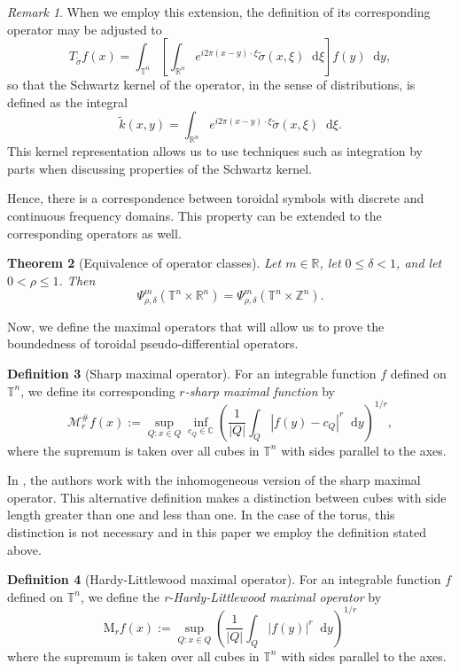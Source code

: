 \documentclass[12pt, reqno]{amsart}
\newtheorem{theorem}{Theorem}[section]
\theoremstyle{definition}
\newtheorem{definition}[theorem]{Definition}
\theoremstyle{remark}
\newtheorem{remark}[theorem]{Remark}
\numberwithin{equation}{section}
\newcommand*\diff{\mathop{}\!\mathrm{d}}
\begin{document}
\begin{remark}
    When we employ this extension, the definition of its corresponding operator may be adjusted to 
    \begin{equation*}
        T_{\tilde{\sigma}}f(x) = \int_{\mathbb{T}^n} \left[ \int_{\mathbb{R}^n} e^{i2\pi (x-y) \cdot \xi} \tilde{\sigma}(x, \xi)\diff \xi \right] f(y) \diff y ,
    \end{equation*}
    so that the Schwartz kernel of the operator, in the sense of distributions, is defined as the integral 
    \begin{equation*}
        \tilde{k}(x, y) = \int_{\mathbb{R}^n} e^{i2\pi (x-y) \cdot \xi} \tilde{\sigma}(x, \xi)\diff \xi.
    \end{equation*}
    This kernel representation allows us to use techniques such as integration by parts when discussing properties of the Schwartz kernel.
\end{remark}
Hence, there is a correspondence between toroidal symbols with discrete and continuous frequency domains. This property can be extended to the corresponding operators as well.
\begin{theorem}[Equivalence of operator classes]
    Let $m \in \mathbb{R}$, let $0\leq\delta<1$, and let $0< \rho \leq 1$. Then 
        \begin{equation*}
            \Psi^m_{\rho,\delta}(\mathbb{T}^n\times \mathbb{R}^n) = \Psi^m_{\rho,\delta}(\mathbb{T}^n\times \mathbb{Z}^n).
        \end{equation*}
\end{theorem}
Now, we define the maximal operators that will allow us to prove the boundedness of toroidal pseudo-differential operators.
\begin{definition}[Sharp maximal operator]
    For an integrable function $f$ defined on $\mathbb{T}^n$, we define its corresponding \textit{$r$-sharp maximal function} by 
    \begin{equation*}
        \mathcal{M}^\#_rf(x) := \sup_{Q:x\in Q} \inf_{c_Q \in \mathbb{C}}\left(
        \frac{1}{|Q|} \int_Q |f(y) - c_Q|^r\diff y
        \right)^{1/r},
    \end{equation*}
    where the supremum is taken over all cubes in $\mathbb{T}^n$ with sides parallel to the axes.
\end{definition}
In \cite{park-tomita}, the authors work with the inhomogeneous version of the sharp maximal operator. This alternative definition makes a distinction between cubes with side length greater than one and less than one. In the case of the torus, this distinction is not necessary and in this paper we employ the definition stated above.
\begin{definition}[Hardy-Littlewood maximal operator]
    For an integrable function $f$ defined on $\mathbb{T}^n$, we define the \textit{r-Hardy-Littlewood maximal operator} by 
    \begin{equation*}
        \mathrm{M}_rf(x) := \sup_{Q:x\in Q} \left( 
        \frac{1}{|Q|} \int_Q |f(y)|^r \diff y
        \right)^{1/r}
    \end{equation*}
    where the supremum is taken over all cubes in $\mathbb{T}^n$ with sides parallel to the axes.
\end{definition}
\end{document}
